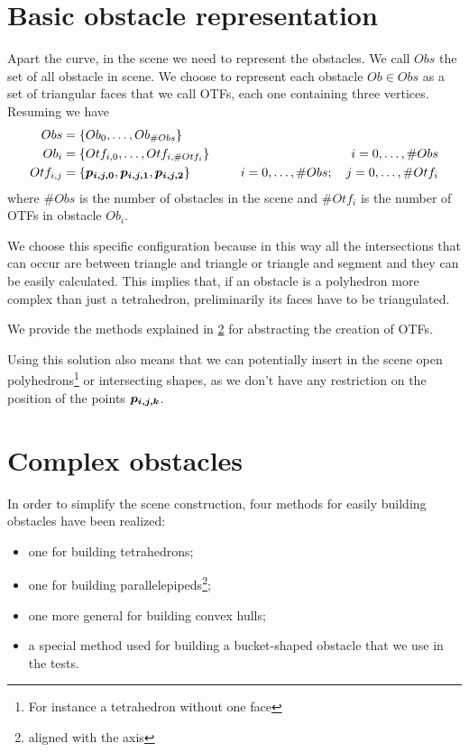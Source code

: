 \documentclass[dissertation.tex]{subfiles}
\begin{document}
\section{Basic obstacle representation}
Apart the curve, in the scene we need to represent the obstacles. We
call $Obs$ the set of all obstacle in scene. We choose to represent
each obstacle $Ob\in Obs$ as a set of triangular faces that we call
\acp{OTF}, each one containing three vertices. Resuming we have
\begin{equation*}
  \begin{split}
    Obs&=\{Ob_0,\dots,Ob_{\#Obs}\}\\
    Ob_i&=\{Otf_{i,0},\dots,Otf_{i,\#Otf_i}\}&i=0,\dots,\#Obs\\
    Otf_{i,j}&=\{\boldsymbol{p_{i,j,0}},\boldsymbol{p_{i,j,1}},\boldsymbol{p_{i,j,2}}\}\quad\qquad&
    i=0,\dots,\#Obs;\quad j=0,\dots,\#Otf_i
  \end{split}
\end{equation*}
where $\#Obs$ is the number of obstacles in the scene and $\#Otf_i$ is
the number of \acp{OTF} in obstacle $Ob_i$.

We choose this specific configuration because in this way all the
intersections that can occur are between triangle and triangle or
triangle and segment and they can be easily calculated. This implies
that, if an obstacle is a polyhedron more complex than just a
tetrahedron, preliminarily its faces have to be triangulated.

We provide the methods explained in \cref{sec:complexObs} for
abstracting the creation of \acp{OTF}.

Using this solution also means that we can potentially insert in the
scene open polyhedrons\footnote{For instance a tetrahedron without one
  face} or intersecting shapes, as we don't have
any restriction on the position of the points $\boldsymbol{p_{i,j,k}}$.

\section{Complex obstacles}\label{sec:complexObs}
In order to simplify the scene construction, four methods for easily
building obstacles have been realized: 
\begin{itemize}
\item one for building tetrahedrons;
\item one for building parallelepipeds\footnote{aligned with the axis};  
\item one more general for building convex hulls;
\item a special method used for building a bucket-shaped obstacle that
  we use in the tests.
\end{itemize}
\end{document}
